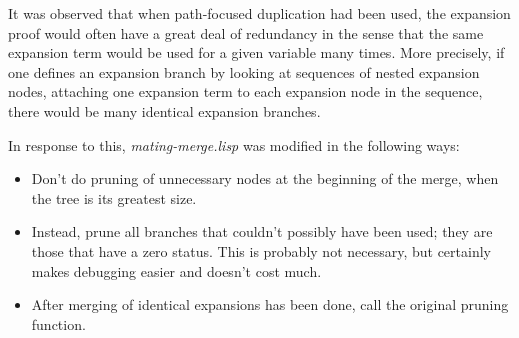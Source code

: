 It was observed that when path-focused duplication had been
used, the expansion proof would often have a great deal of redundancy
in the sense that the same expansion term would be used for a given variable
many times. More precisely, if one defines an expansion branch by
looking at sequences of nested expansion nodes, attaching one expansion
term to each expansion node in the sequence, there would be many identical
expansion branches. 

In response to this, {\it mating-merge.lisp} was modified in the following ways:
\begin{itemize}
\item Don't do pruning of unnecessary nodes at the beginning of the merge,
when the tree is its greatest size. 

\item Instead, prune all branches that couldn't possibly have been used; 
they are those that have a zero status. This is probably not necessary,
but certainly makes debugging easier and doesn't cost much.

\item After merging of identical expansions has been done, call the original
pruning function.
\end{itemize}
